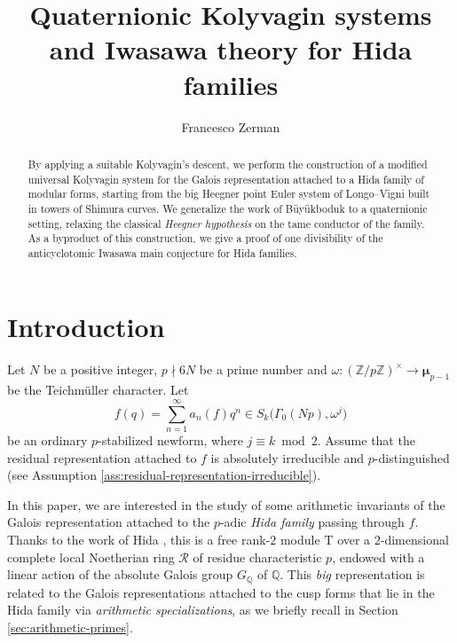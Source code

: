 \documentclass[12pt,reqno]{amsart}
\author{Francesco Zerman}
\title{Quaternionic Kolyvagin systems and Iwasawa theory for Hida families}
\theoremstyle{definition}
\theoremstyle{remark}
\newcommand{\numberset}{\mathbb}
\newcommand{\Q}{\numberset{Q}}
\newcommand{\Z}{\numberset{Z}}
\newcommand{\T}{\boldsymbol{\mathrm{T}}}
\newcommand{\calR}{\mathcal{R}}
\begin{document}
	
	
	
	\begin{abstract}
    	By applying a suitable Kolyvagin's descent, we perform the construction of a modified universal Kolyvagin system for the Galois representation attached to a Hida family of modular forms, starting from the big Heegner point Euler system of Longo--Vigni \cite{Longo-Vigni11:quaternion-algebras-Hida-families} built in towers of Shimura curves. We generalize the work of B{\"u}y{\"u}kboduk \cite{Buyukboduk:big-Heegner-point-kolyvagin-system} to a quaternionic setting, relaxing the classical \emph{Heegner hypothesis} on the tame conductor of the family. As a byproduct of this construction, we give a proof of one divisibility of the anticyclotomic Iwasawa main conjecture for Hida families.
	\end{abstract}

    \maketitle


\section{Introduction}

Let $N$ be a positive integer, $p\nmid 6N$ be a prime number and $\omega\colon (\Z/p\Z)^\times\to \boldsymbol{\mu}_{p-1}$ be the Teichm\"uller character. Let 
\begin{equation*}
	f(q)=\sum_{n=1}^\infty a_n(f)q^n\in S_k\big(\Gamma_0(Np),\omega^j\big)
\end{equation*}
be an ordinary $p$-stabilized newform, where $j\equiv k\bmod 2$. Assume that the residual representation attached to $f$ is absolutely irreducible and $p$-distinguished (see Assumption \ref{ass:residual-representation-irreducible}).

In this paper, we are interested in the study of some arithmetic invariants of the Galois representation attached to the $p$-adic \emph{Hida family} passing through $f$. Thanks to the work of Hida \cite{Hida86:Galois-representations, Hida86:Iwasawa-modules}, this is a free rank-$2$ module $\T$ over a $2$-dimensional complete local Noetherian ring $\calR$ of residue characteristic $p$, endowed with a linear action of the absolute Galois group $G_\Q$ of $\Q$. This \emph{big} representation is related to the Galois representations attached to the cusp forms that lie in the Hida family via \emph{arithmetic specializations}, as we briefly recall in Section \ref{sec:arithmetic-primes}.
\end{document}
